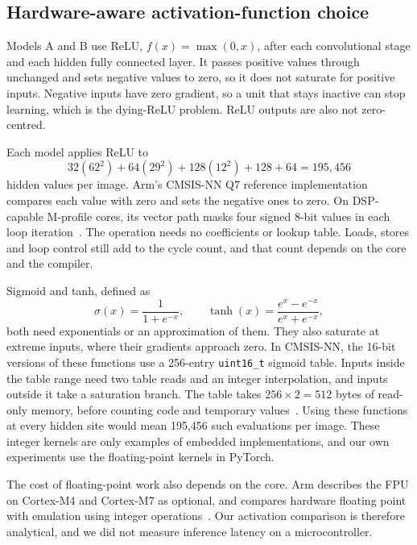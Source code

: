 \subsection{Hardware-aware activation-function choice}
\label{sec:activation-choice}

Models A and B use ReLU, $f(x)=\max(0,x)$, after each convolutional stage and
each hidden fully connected layer.  It passes positive values through
unchanged and sets negative values to zero, so it does not saturate for
positive inputs.  Negative inputs have zero gradient, so a unit that stays
inactive can stop learning, which is the dying-ReLU problem.  ReLU outputs are
also not zero-centred.

Each model applies ReLU to
\begin{equation}
  32(62^2)+64(29^2)+128(12^2)+128+64=195{,}456
\end{equation}
hidden values per image.  Arm's CMSIS-NN Q7 reference implementation compares
each value with zero and sets the negative ones to zero.  On DSP-capable
M-profile cores, its vector path masks four signed 8-bit values in each loop
iteration~\cite[\texttt{arm\_relu\_q7.c}, ll.~50--101]{cmsisnn}.
The operation needs no coefficients or lookup table.  Loads, stores and loop
control still add to the cycle count, and that count depends on the core and
the compiler.

Sigmoid and tanh, defined as
\begin{equation}
  \sigma(x)=\frac{1}{1+e^{-x}}, \qquad
  \tanh(x)=\frac{e^x-e^{-x}}{e^x+e^{-x}},
\end{equation}
both need exponentials or an approximation of them.  They also saturate at
extreme inputs, where their gradients approach zero.  In CMSIS-NN,
the 16-bit versions of these functions use a 256-entry \texttt{uint16\_t}
sigmoid table.  Inputs inside the table range need two table reads and an
integer interpolation, and inputs outside it take a saturation branch.  The
table takes $256\times2=512$ bytes of read-only memory, before counting code
and temporary values~\cite[\texttt{arm\_nn\_activation\_s16.c}, ll.~51--117; \texttt{arm\_nn\_tables.h}, l.~40]{cmsisnn}.
Using these functions at every hidden site would mean 195,456 such
evaluations per image.  These integer kernels are only examples of embedded
implementations, and our own experiments use the floating-point kernels in
PyTorch.

The cost of floating-point work also depends on the core.  Arm describes the
FPU on Cortex-M4 and Cortex-M7 as optional, and compares hardware floating
point with emulation using integer operations~\cite[pp.~4--5]{arm2016dsp}.
Our activation comparison is therefore analytical, and we did not measure
inference latency on a microcontroller.

